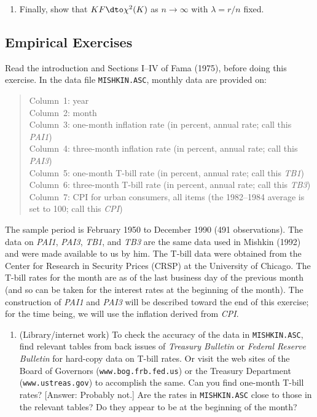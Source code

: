 \begin{problemset}
\begin{enumerate}[label=(\alph*)]
\item Finally, show that $KF \dto \chi^2(K)$ as $n \to \infty$ with $\lambda = r/n$ fixed.
\end{enumerate}

\subsection*{Empirical Exercises}

\exercise[1]
Read the introduction and Sections I--IV of Fama (1975), before doing this
exercise. In the data file \texttt{MISHKIN.ASC}, monthly data are provided on:

\begin{quote}
Column~1: year \\
Column~2: month \\
Column~3: one-month inflation rate (in percent, annual rate; call this \emph{PAI1}) \\
Column~4: three-month inflation rate (in percent, annual rate; call this \emph{PAI3}) \\
Column~5: one-month T-bill rate (in percent, annual rate; call this \emph{TB1}) \\
Column~6: three-month T-bill rate (in percent, annual rate; call this \emph{TB3}) \\
Column~7: CPI for urban consumers, all items (the 1982--1984 average is set to 100; call this \emph{CPI})
\end{quote}

The sample period is February 1950 to December 1990 (491 observations).
The data on \emph{PAI1}, \emph{PAI3}, \emph{TB1}, and \emph{TB3} are the same data used in Mishkin
(1992) and were made available to us by him. The T-bill data were obtained
from the Center for Research in Security Prices (CRSP) at the University of
Chicago. The T-bill rates for the month are as of the last business day of the
previous month (and so can be taken for the interest rates at the beginning of the
month). The construction of \emph{PAI1} and \emph{PAI3} will be described toward the end
of this exercise; for the time being, we will use the inflation derived from \emph{CPI}.

\begin{enumerate}[label=(\alph*)]
\item (Library/internet work)\quad
To check the accuracy of the data in \texttt{MISHKIN.ASC}, find relevant tables from back issues of \emph{Treasury Bulletin} or
\emph{Federal Reserve Bulletin} for hard-copy data on T-bill rates. Or visit the
web sites of the Board of Governors (\texttt{www.bog.frb.fed.us}) or the Treasury Department (\texttt{www.ustreas.gov}) to accomplish the same. Can you
find one-month T-bill rates? [Answer: Probably not.] Are the rates in
\texttt{MISHKIN.ASC} close to those in the relevant tables? Do they appear to be
at the beginning of the month?


\end{enumerate}
\end{problemset}
